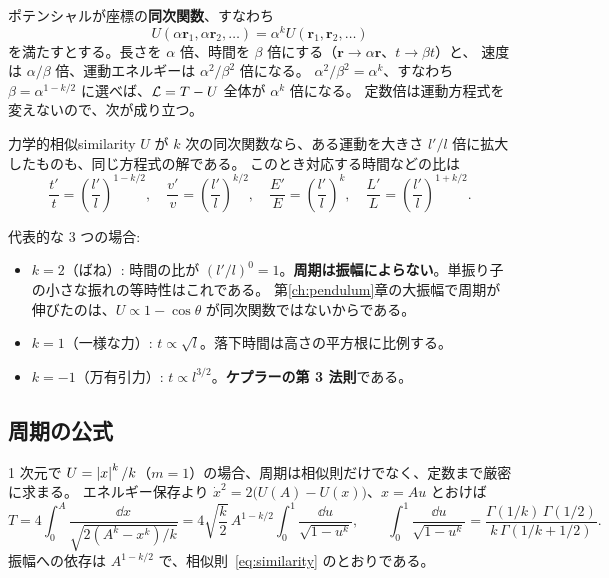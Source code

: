 ポテンシャルが座標の\textbf{同次関数}、すなわち
\begin{equation}
  U(\alpha\bm r_1,\alpha\bm r_2,\dots)=\alpha^kU(\bm r_1,\bm r_2,\dots)
  \label{eq:homogeneous}
\end{equation}
を満たすとする。長さを $\alpha$ 倍、時間を $\beta$ 倍にする（$\bm r\to\alpha\bm r$、$t\to\beta t$）と、
速度は $\alpha/\beta$ 倍、運動エネルギーは $\alpha^2/\beta^2$ 倍になる。
$\alpha^2/\beta^2=\alpha^k$、すなわち $\beta=\alpha^{1-k/2}$ に選べば、$\mathcal{L}=T-U$ 全体が $\alpha^k$ 倍になる。
定数倍は運動方程式を変えないので、次が成り立つ。

\begin{result}{力学的相似}{similarity}
$U$ が $k$ 次の同次関数なら、ある運動を大きさ $l'/l$ 倍に拡大したものも、同じ方程式の解である。
このとき対応する時間などの比は
\begin{equation}
  \frac{t'}{t}=\left(\frac{l'}{l}\right)^{1-k/2},\quad
  \frac{v'}{v}=\left(\frac{l'}{l}\right)^{k/2},\quad
  \frac{E'}{E}=\left(\frac{l'}{l}\right)^{k},\quad
  \frac{L'}{L}=\left(\frac{l'}{l}\right)^{1+k/2}.
  \label{eq:similarity}
\end{equation}
\end{result}

代表的な 3 つの場合:
\begin{itemize}
  \item $k=2$（ばね）: 時間の比が $(l'/l)^0=1$。\textbf{周期は振幅によらない}。単振り子の小さな振れの等時性はこれである。
    第\ref{ch:pendulum}章の大振幅で周期が伸びたのは、$U\propto1-\cos\theta$ が同次関数ではないからである。
  \item $k=1$（一様な力）: $t\propto\sqrt l$。落下時間は高さの平方根に比例する。
  \item $k=-1$（万有引力）: $t\propto l^{3/2}$。\textbf{ケプラーの第 3 法則}である。
\end{itemize}

\subsection*{周期の公式}

1 次元で $U=\left\lvert x\right\rvert^k/k$（$m=1$）の場合、周期は相似則だけでなく、定数まで厳密に求まる。
エネルギー保存より $\dot x^2=2\bigl(U(A)-U(x)\bigr)$、$x=Au$ とおけば
\begin{equation}
  T=4\int_0^A\frac{\dd x}{\sqrt{2(A^k-x^k)/k}}
  =4\sqrt{\frac k2}\,A^{1-k/2}\int_0^1\frac{\dd u}{\sqrt{1-u^k}},\qquad
  \int_0^1\frac{\dd u}{\sqrt{1-u^k}}=\frac{\Gamma(1/k)\,\Gamma(1/2)}{k\,\Gamma(1/k+1/2)} .
  \label{eq:power-period}
\end{equation}
振幅への依存は $A^{1-k/2}$ で、相似則~\eqref{eq:similarity} のとおりである。

